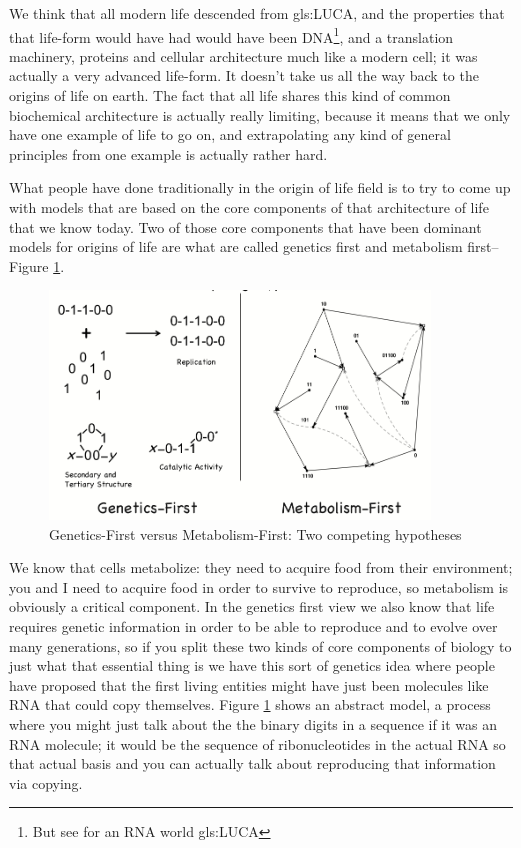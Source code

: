 \documentclass[]{article}
\begin{document}
We think that all modern life descended from \gls{gls:LUCA}, and the properties that that life-form would have had would have been DNA\footnote{But see \cite{glansdorff2008last} for an RNA world \gls{gls:LUCA}}, and a translation machinery, proteins and cellular architecture much like a modern cell; it was actually a very advanced life-form. It doesn't take us all the way back to the origins of life on earth.
The fact that all life shares this kind of common biochemical architecture is actually really limiting, because it means that we only have one example of life to go on, and extrapolating any kind of general principles from one example is actually rather hard.

What people have done traditionally in the origin of life field is to try to come up with
models that are based on the core components of that architecture of life
that we know today. Two of those core components that have been dominant models for origins of life are what are called genetics first  and metabolism first--Figure \ref{fig:GeneticsVsMetabolism}.

\begin{figure}[H]
	\caption[Genetics-First versus Metabolism-First]{Genetics-First versus Metabolism-First: Two competing hypotheses}\label{fig:GeneticsVsMetabolism}
	\includegraphics[width=0.9\textwidth]{GeneticsVsMetabolism}
\end{figure}

We know that cells metabolize: they need to acquire food from their environment; you and I need to acquire food in order to survive to reproduce, so metabolism is obviously a
critical component. 
In the genetics first view we also know that life requires genetic information in order to be able to reproduce and to evolve over many generations, so if you split these two kinds of core components of biology to just what that essential thing is we have this sort of genetics idea where people have proposed that the first living entities might have just been molecules like RNA that could copy themselves.
 Figure \ref{fig:GeneticsVsMetabolism} shows an
abstract model, a process
where you might just talk about the the
binary digits in a sequence if it was an
RNA molecule; it would be the sequence of
ribonucleotides in the actual RNA so
that actual basis and you can actually
talk about reproducing that information
via copying.
\end{document}
